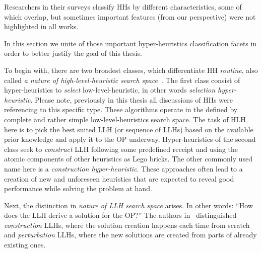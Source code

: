 Researchers in their surveys classify HHs by different characteristics, some of which overlap, but sometimes important features (from our perspective) were not highlighted in all works. 

In this section we unite of those important hyper-heuristics classification facets in order to better justify the goal of this thesis.

To begin with, there are two broadest classes, which differentiate HH \emph{routine}, also called \emph{a nature of high-level-heuristic search space}~\cite{burke2013hyper,burke2019classification,drake2019recent}.
The first class consist of hyper-heuristics to \emph{select} low-level-heuristic, in other words \emph{selection hyper-heuristic}. Please note, previously in this thesis all discussions of HHs were referencing to this specific type. These algorithms operate in the defined by complete and rather simple low-level-heuristics search space. The task of HLH here is to pick the best suited LLH (or sequence of LLHs) based on the available prior knowledge and apply it to the OP underway. %
Hyper-heuristics of the second class seek to \emph{construct} LLH following some predefined receipt and using the atomic components of other heuristics as Lego bricks. The other commonly used name here is a \emph{construction hyper-heuristic}. These approaches often lead to a creation of new and unforeseen heuristics that are expected to reveal good performance while solving the problem at hand.

Next, the distinction in \emph{nature of LLH search space} arises. 
In other words: ``How does the LLH derive a solution for the OP?'' The authors in~\cite{burke2013hyper,burke2019classification,drake2019recent} distinguished \emph{construction} LLHs, where the solution creation happens each time from scratch and \emph{perturbation} LLHs, where the new solutions are created from parts of already existing ones.

